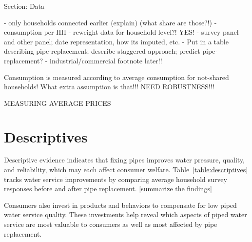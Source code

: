 \documentclass[12pt,table]{article}
\begin{document}



Section: Data

	- only households connected earlier (explain) (what share are those?!)
	- consumption per HH
	- reweight data for household level?! YES!
	- survey panel and other panel; date representation, how its imputed, etc.
	- Put in a table describing pipe-replacement;  describe staggered approach; predict pipe-replacement?
	- industrial/commercial footnote later!!

Consumption is measured according to average consumption for not-shared households!  What extra assumption is that!!!  NEED ROBUSTNESS!!! 

MEASURING AVERAGE PRICES


\section{Descriptives}

Descriptive evidence indicates that fixing pipes improves water pressure, quality, and reliability, which may each affect consumer welfare.  Table~\ref{table:descriptives} tracks water service improvements by comparing average household survey responses before and after pipe replacement.   [summarize the findings]

Consumers also invest in products and behaviors to compensate for low piped water service quality.  These investments help reveal which aspects of piped water service are most valuable to consumers as well as most affected by pipe replacement.  
\end{document}
